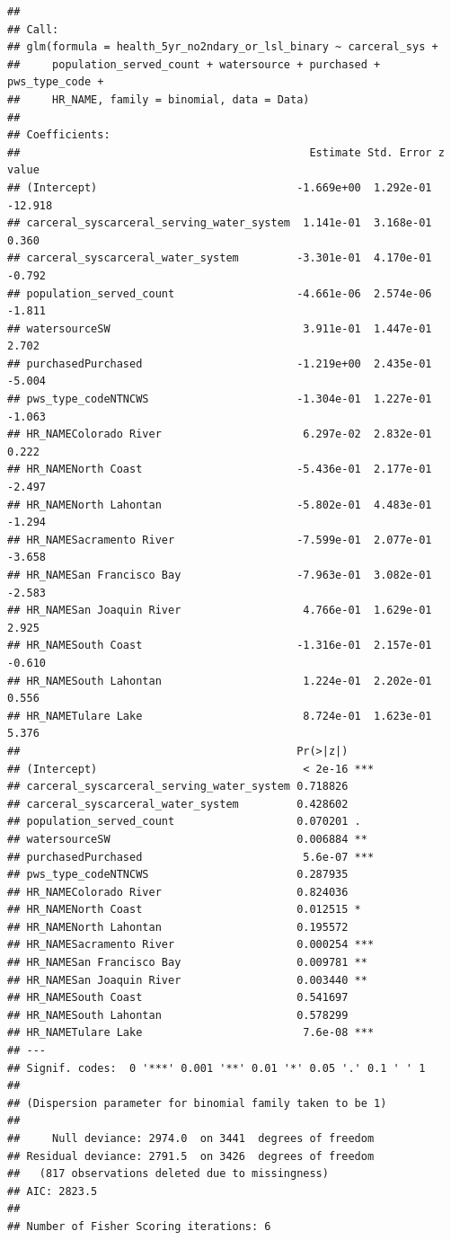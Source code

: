 \documentclass[
]{article}
\begin{document}
\begin{verbatim}
## 
## Call:
## glm(formula = health_5yr_no2ndary_or_lsl_binary ~ carceral_sys + 
##     population_served_count + watersource + purchased + pws_type_code + 
##     HR_NAME, family = binomial, data = Data)
## 
## Coefficients:
##                                             Estimate Std. Error z value
## (Intercept)                               -1.669e+00  1.292e-01 -12.918
## carceral_syscarceral_serving_water_system  1.141e-01  3.168e-01   0.360
## carceral_syscarceral_water_system         -3.301e-01  4.170e-01  -0.792
## population_served_count                   -4.661e-06  2.574e-06  -1.811
## watersourceSW                              3.911e-01  1.447e-01   2.702
## purchasedPurchased                        -1.219e+00  2.435e-01  -5.004
## pws_type_codeNTNCWS                       -1.304e-01  1.227e-01  -1.063
## HR_NAMEColorado River                      6.297e-02  2.832e-01   0.222
## HR_NAMENorth Coast                        -5.436e-01  2.177e-01  -2.497
## HR_NAMENorth Lahontan                     -5.802e-01  4.483e-01  -1.294
## HR_NAMESacramento River                   -7.599e-01  2.077e-01  -3.658
## HR_NAMESan Francisco Bay                  -7.963e-01  3.082e-01  -2.583
## HR_NAMESan Joaquin River                   4.766e-01  1.629e-01   2.925
## HR_NAMESouth Coast                        -1.316e-01  2.157e-01  -0.610
## HR_NAMESouth Lahontan                      1.224e-01  2.202e-01   0.556
## HR_NAMETulare Lake                         8.724e-01  1.623e-01   5.376
##                                           Pr(>|z|)    
## (Intercept)                                < 2e-16 ***
## carceral_syscarceral_serving_water_system 0.718826    
## carceral_syscarceral_water_system         0.428602    
## population_served_count                   0.070201 .  
## watersourceSW                             0.006884 ** 
## purchasedPurchased                         5.6e-07 ***
## pws_type_codeNTNCWS                       0.287935    
## HR_NAMEColorado River                     0.824036    
## HR_NAMENorth Coast                        0.012515 *  
## HR_NAMENorth Lahontan                     0.195572    
## HR_NAMESacramento River                   0.000254 ***
## HR_NAMESan Francisco Bay                  0.009781 ** 
## HR_NAMESan Joaquin River                  0.003440 ** 
## HR_NAMESouth Coast                        0.541697    
## HR_NAMESouth Lahontan                     0.578299    
## HR_NAMETulare Lake                         7.6e-08 ***
## ---
## Signif. codes:  0 '***' 0.001 '**' 0.01 '*' 0.05 '.' 0.1 ' ' 1
## 
## (Dispersion parameter for binomial family taken to be 1)
## 
##     Null deviance: 2974.0  on 3441  degrees of freedom
## Residual deviance: 2791.5  on 3426  degrees of freedom
##   (817 observations deleted due to missingness)
## AIC: 2823.5
## 
## Number of Fisher Scoring iterations: 6
\end{verbatim}
\end{document}
